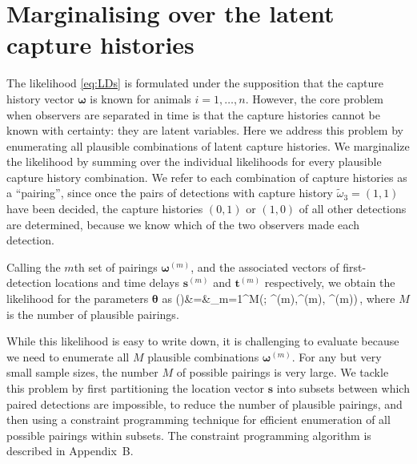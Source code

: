 \documentclass[useAMS, usenatbib, referee]{biom}\usepackage[]{graphicx}\usepackage[]{color}
\newcommand{\dotomega}{\tilde{\omega}}
\begin{document}

\section{Marginalising over the latent capture histories}

The likelihood \eqref{eq:LDs} %
is formulated under the supposition that the capture history vector $\bm{\omega}$ is known for animals $i=1, \ldots, n$. However, the core problem when observers are separated in time is that the capture histories cannot be known with certainty: they are latent variables. Here we address this problem by enumerating all plausible combinations of latent capture histories. We marginalize the likelihood by summing over the individual likelihoods for every plausible capture history combination. We refer to each combination of capture histories as a ``pairing'', since once the pairs of detections with capture history $\dotomega_3=(1,1)$ have been decided, the capture histories $(0, 1)$ or $(1, 0)$ of all other detections are determined, because we know which of the two observers made each detection.

Calling the $m$th set of pairings $\bm{\omega}^{(m)}$, and the associated vectors of first-detection locations and time delays  $\bm{s}^{(m)}$ and $\bm{t}^{(m)}$ respectively, we obtain the likelihood for the parameters $\bm{\theta}$ as
\be
{}(\bm{\theta})&=&\sum_{m=1}^M\left(\bm{\theta}; ^{(m)},\bm{\omega}^{(m)}, ^{(m)}\right)\,,
\ee
\noindent
where $M$ is the number of plausible pairings.


While this likelihood is easy to write down, it is challenging to evaluate because we need to enumerate all $M$ plausible combinations $\bm{\omega}^{(m)}$. For any but very small sample sizes, the number $M$ of possible pairings is very large. We tackle this problem by first partitioning the location vector $\bm{s}$ into subsets between which paired detections are impossible, to reduce the number of plausible pairings, and then using a constraint programming technique for efficient enumeration of all possible pairings within subsets. The constraint programming algorithm is described in Appendix~B.
\end{document}
